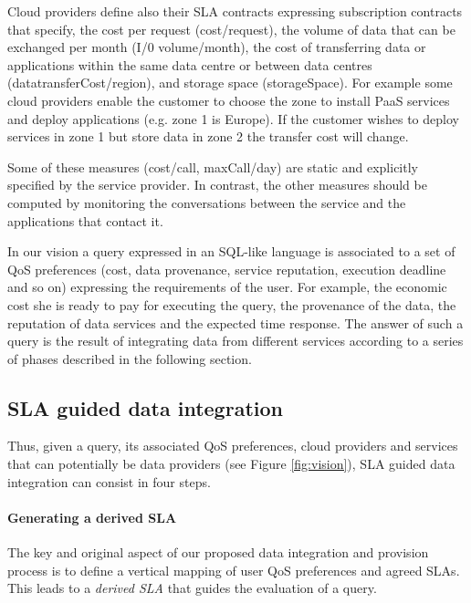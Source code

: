 Cloud providers define also their SLA contracts expressing  subscription contracts that specify, the cost per request ({\sf cost/request}), the volume of data that can be exchanged per month ({\sf I/0 volume/month}), the cost of transferring data or applications within the same data centre or between data centres ({\sf datatransferCost/region}), and storage space ({\sf storageSpace}). For example some cloud providers enable the customer to choose the zone to install PaaS services and deploy applications (e.g. zone 1 is Europe). If the customer wishes to deploy services in zone 1 but store data in zone 2 the transfer cost will change.



Some of these measures ({\sf cost/call, maxCall/day}) are static and explicitly specified by the service provider. 
In contrast, the other measures should be computed by monitoring the conversations between the service and the applications that contact it.  

In our vision a query expressed in an SQL-like language is associated to a set of QoS preferences (cost, data provenance, service reputation, execution deadline and so on) expressing the requirements of the user. For example, the economic cost she is ready to pay for executing the query, the provenance of the data, the reputation of data services and the expected time response. The answer of such a query is the result of integrating data from different services according to a series of phases described in the following section.

\subsection{SLA guided data integration}
Thus, given a query, its associated QoS preferences, cloud providers  and  services that can potentially be data providers (see Figure \ref{fig:vision}),  SLA guided data  integration can consist in four steps.  
\paragraph{Generating a derived SLA}  
The key and original aspect of   our proposed data integration and provision process is  to define  a vertical mapping of user QoS preferences and agreed SLAs. This  leads to a {\em derived SLA} that guides the evaluation of a query. 

